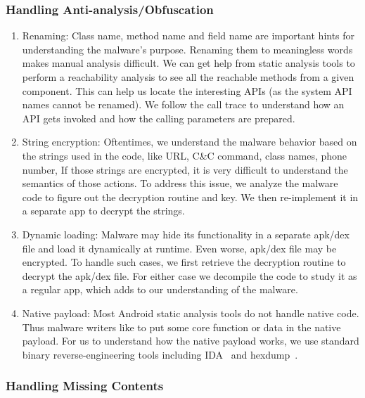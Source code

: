 \subsubsection{Handling Anti-analysis/Obfuscation}

\begin{enumerate}[label=\alph*)]

\item Renaming: Class name, method name and field name are important hints for understanding
the malware's purpose. Renaming them to meaningless words makes manual analysis difficult.
We can get help from static analysis tools to perform a reachability analysis to see all the
reachable methods from a given component. This can help us locate the interesting APIs 
(as the system API names cannot be renamed). We follow the call trace to understand 
how an API gets invoked and
how the calling parameters are prepared. 

\item String encryption: Oftentimes, we understand the malware behavior based on the strings used
in the code, like URL, C\&C command, class names, phone number, \etc
If those strings are encrypted, it is very difficult to understand the semantics of those actions.
To address this issue, we analyze the malware code to figure out the decryption routine and key.
We then re-implement it in a separate app to decrypt the strings.
\item Dynamic loading: Malware may hide its functionality in a separate apk/dex file and load it
dynamically at runtime. Even worse, apk/dex file may be encrypted. To handle such cases, we first
retrieve the decryption routine to decrypt the apk/dex file. For either case we decompile the code to study it 
as a regular app, which adds to our understanding of the malware.
\item Native payload: Most Android static analysis tools do not handle native code. Thus malware writers
like to put some core function or data in the native payload. For us to understand how the native
payload works, we use standard binary reverse-engineering tools including IDA~\cite{ida} and hexdump~\cite{hexdump}.
\end{enumerate}

\subsubsection{Handling Missing Contents}

